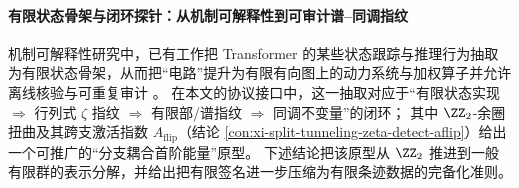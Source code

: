 \paragraph{有限状态骨架与闭环探针：从机制可解释性到可审计谱--同调指纹}
机制可解释性研究中，已有工作把 Transformer 的某些状态跟踪与推理行为抽取为有限状态骨架，从而把“电路”提升为有限有向图上的动力系统与加权算子并允许离线核验与可重复审计 \cite{SomvanshiIslamRafeTustiChakrabortyBaitullahChowdhuryAlnawmasiDuttaDas2026BridgingBlackBoxSurveyMechInterp,zhang-etal-2025-finite}。
在本文的协议接口中，这一抽取对应于“有限状态实现 \(\Rightarrow\) 行列式 \(\zeta\) 指纹 \(\Rightarrow\) 有限部/谱指纹 \(\Rightarrow\) 同调不变量”的闭环；
其中 \(\ZZ_2\)-余圈扭曲及其跨支激活指数 \(A_{\mathrm{flip}}\)（结论 \ref{con:xi-split-tunneling-zeta-detect-aflip}）给出一个可推广的“分支耦合首阶能量”原型。
下述结论把该原型从 \(\ZZ_2\) 推进到一般有限群的表示分解，并给出把有限签名进一步压缩为有限条迹数据的完备化准则。

